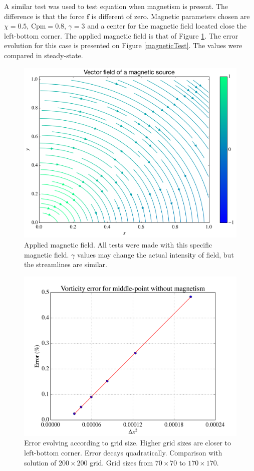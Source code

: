 \documentclass[journal]{IEEEtran}
\begin{document}
A similar test was used to test equation when magnetism is present. The difference is that the force $\mathbf{f}$ is different of zero. Magnetic parameters chosen are $\chi=0.5$, $\mathrm{Cpm}=0.8$, $\gamma=3$ and a center for the magnetic field located close the left-bottom corner. The applied magnetic field is that of Figure \ref{magneticField}. The error evolution for this case is presented on Figure \ref{magneticTest}. The values were compared in steady-state.

\begin{figure}[!t]
\centering
\includegraphics[width=\linewidth]{figures/vectorFieldH}
\caption{Applied magnetic field. All tests were made with this specific magnetic field. $\gamma$ values may change the actual intensity of field, but the streamlines are similar.\label{magneticField}}
\end{figure}


\begin{figure}[!t]
\centering
\includegraphics[width=\linewidth]{figures/validateHydrodynamicsRe40}
\caption{Error evolving according to grid size. Higher grid sizes are closer to left-bottom corner. Error decays quadratically. Comparison with solution of $200\times 200$ grid. Grid sizes from $70\times 70$ to $170\times 170$. \label{hydrodynamicsTest}}
\end{figure}
\end{document}
